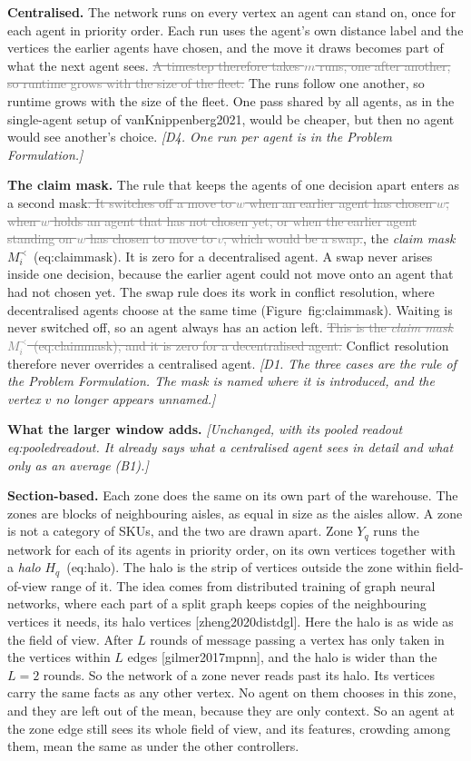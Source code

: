 \documentclass[11pt,a4paper]{article}
\newcommand{\new}[1]{\textcolor{newc}{#1}}
\newcommand{\old}[1]{\textcolor{gray}{\sout{#1}}}
\newcommand{\note}[1]{{\small\itshape [#1]}}
\newcommand{\lab}[1]{\textsf{\footnotesize #1}}
\renewcommand{\ref}[1]{\lab{#1}}
\renewcommand{\eqref}[1]{(\lab{#1})}
\newcommand{\citep}[1]{[\lab{#1}]}
\newcommand{\citet}[1]{\lab{#1}}
\begin{document}
\textbf{Centralised.} The network runs on every vertex an agent can stand
on, once for each agent in priority order. Each run uses the agent's own
distance label and the vertices the earlier agents have chosen, and the move
it draws becomes part of what the next agent sees. \old{A timestep therefore
takes $m$ runs, one after another, so runtime grows with the size of the
fleet.} \new{The runs follow one another, so runtime grows with the size of
the fleet.} One pass shared by all agents, as in the single-agent setup of
\citet{vanKnippenberg2021}, would be cheaper, but then no agent would see
another's choice. \note{D4. One run per agent is in the Problem Formulation.}

\textbf{The claim mask.} The rule that keeps the agents of one decision
apart enters as a second mask\old{. It switches off a move to $w$ when an
earlier agent has chosen $w$, when $w$ holds an agent that has not chosen
yet, or when the earlier agent standing on $w$ has chosen to move to $v$,
which would be a swap.}\new{, the \emph{claim mask}
$M^{\prec}_i$~\eqref{eq:claimmask}. It is zero for a decentralised agent.}
A swap never arises inside one decision, because the earlier agent could not
move onto an agent that had not chosen yet. The swap rule does its work in
conflict resolution, where decentralised agents choose at the same time
(Figure~\ref{fig:claimmask}). Waiting is never switched off, so an agent
always has an action left. \old{This is the \emph{claim mask}
$M^{\prec}_i$~\eqref{eq:claimmask}, and it is zero for a decentralised
agent.} Conflict resolution therefore never overrides a centralised agent.
\note{D1. The three cases are the rule of the Problem Formulation. The mask
is named where it is introduced, and the vertex $v$ no longer appears
unnamed.}

\textbf{What the larger window adds.} \emph{[Unchanged, with its pooled
readout \lab{eq:pooledreadout}. It already says what a centralised agent
sees in detail and what only as an average (B1).]}

\textbf{Section-based.} Each zone does the same on its own part of the
warehouse. The zones are blocks of neighbouring aisles, as equal in size as
the aisles allow. A zone is not a category of SKUs, and the two are drawn
apart. Zone $Y_q$ runs the network for each of its agents in priority order,
on its own vertices together with a \emph{halo} $H_q$~\eqref{eq:halo}. The
halo is the strip of vertices outside the zone within field-of-view range of
it. The idea comes from distributed training of graph neural networks, where
each part of a split graph keeps copies of the neighbouring vertices it
needs, its halo vertices \citep{zheng2020distdgl}. Here the halo is as wide
as the field of view. After $L$ rounds of message passing a vertex has only
taken in the vertices within $L$ edges \citep{gilmer2017mpnn}, and the halo
is wider than the $L = 2$ rounds. So the network of a zone never reads past
its halo. Its vertices carry the same facts as any other vertex. No agent on
them chooses in this zone, and they are left out of the mean, because they
are only context. So an agent at the zone edge still sees its whole field of
view, and its features, crowding among them, mean the same as under the
other controllers.
\end{document}
